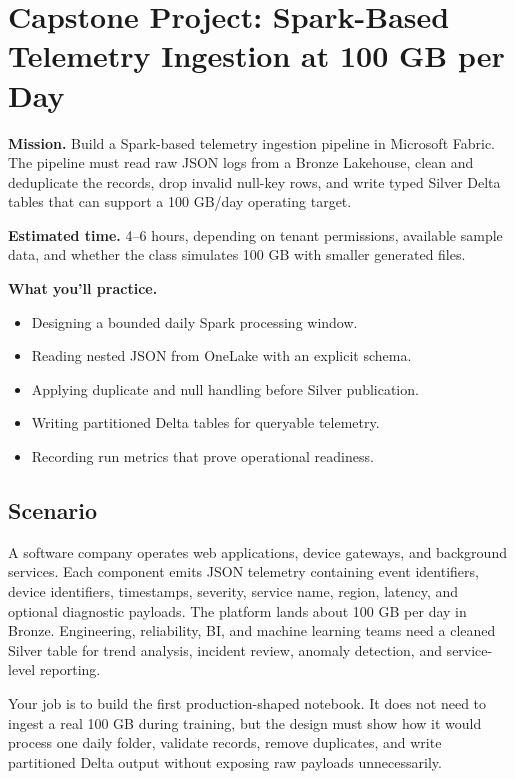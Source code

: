 \section{Capstone Project: Spark-Based Telemetry Ingestion at 100 GB per Day}\label{sec:ch3-capstone}

\begin{capstonebox}
\textbf{Mission.} Build a Spark-based telemetry ingestion pipeline in Microsoft Fabric. The pipeline must read raw JSON logs from a Bronze Lakehouse, clean and deduplicate the records, drop invalid null-key rows, and write typed Silver Delta tables that can support a 100 GB/day operating target.

\textbf{Estimated time.} 4--6 hours, depending on tenant permissions, available sample data, and whether the class simulates 100 GB with smaller generated files.

\textbf{What you'll practice.}
\begin{itemize}
    \item Designing a bounded daily Spark processing window.
    \item Reading nested JSON from OneLake with an explicit schema.
    \item Applying duplicate and null handling before Silver publication.
    \item Writing partitioned Delta tables for queryable telemetry.
    \item Recording run metrics that prove operational readiness.
\end{itemize}
\end{capstonebox}

\subsection*{Scenario}
A software company operates web applications, device gateways, and background services. Each component emits JSON telemetry containing event identifiers, device identifiers, timestamps, severity, service name, region, latency, and optional diagnostic payloads. The platform lands about 100 GB per day in Bronze. Engineering, reliability, BI, and machine learning teams need a cleaned Silver table for trend analysis, incident review, anomaly detection, and service-level reporting.

Your job is to build the first production-shaped notebook. It does not need to ingest a real 100 GB during training, but the design must show how it would process one daily folder, validate records, remove duplicates, and write partitioned Delta output without exposing raw payloads unnecessarily.

